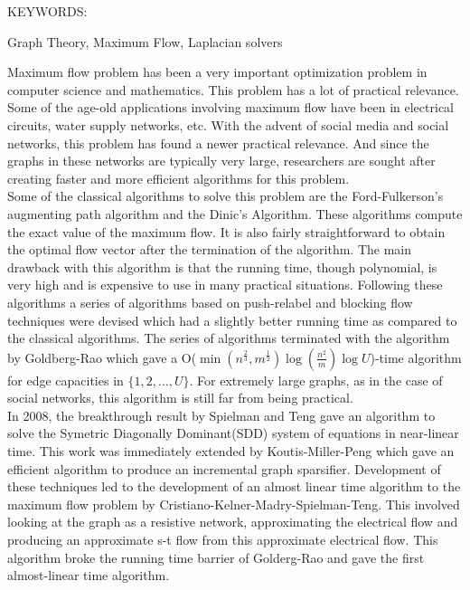 \documentclass[BTech]{iitmdiss}
\begin{document}
\abstract

\noindent KEYWORDS: \hspace*{0.5em} \parbox[t]{4.4in}{Graph Theory,
Maximum Flow, Laplacian solvers }

\vspace*{24pt}

Maximum flow problem has been a very important optimization problem in computer science and mathematics. This problem has a lot of practical relevance.
Some of the age-old applications involving maximum flow have been in electrical circuits, water supply networks, etc. With the advent of social media
and social networks, this problem has found a newer practical relevance. And since the graphs in these networks are typically very large,
researchers are sought after creating faster and more efficient algorithms for this problem. \\

Some of the classical algorithms to solve this problem are the Ford-Fulkerson's augmenting path algorithm and the Dinic's Algorithm. These algorithms
compute the exact value of the maximum flow. It is also fairly straightforward to obtain the optimal flow vector after the termination of the
algorithm. The main drawback with this algorithm is that the running time, though polynomial, is very high and is expensive to use in many practical
situations. Following these algorithms a series of algorithms based on push-relabel and blocking flow techniques were devised which had a slightly better running time as compared to the 
classical algorithms. The series of algorithms terminated with the algorithm by Goldberg-Rao which gave a O($\min(n^{\frac{2}{3}},m^{\frac{1}{2}}) \log(\frac{n^2}{m}) \log U$)-time algorithm
for edge capacities in $\{1,2,\ldots,U\}$. For 
extremely large graphs, as in the case of social networks, this algorithm is still far from being practical. \\

In 2008, the breakthrough result by Spielman and Teng gave an algorithm to solve the Symetric Diagonally Dominant(SDD) system of equations in 
near-linear time. This work was immediately extended by Koutis-Miller-Peng which gave an efficient algorithm to produce an incremental graph sparsifier.
Development of these techniques led to the development of an almost linear time algorithm to the maximum flow problem by Cristiano-Kelner-Madry-Spielman-Teng.
This involved looking at the graph as a resistive network, approximating the electrical flow and producing an approximate s-t flow from this approximate
electrical flow. This algorithm broke the running time barrier of Golderg-Rao and gave the first almost-linear time algorithm. \\
\end{document}
